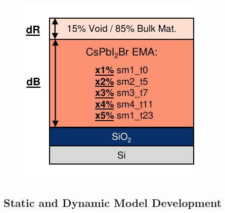 \begin{figure}
  \centering
  \medskip
  \includegraphics[width=.4\textwidth]{chapters/ellipsometry/image/Dynamic_Model.pdf}
  \caption{}
  \label{fig:ellipsometry:dynamic_model}
\end{figure}



\subsection{Static and Dynamic Model Development}

